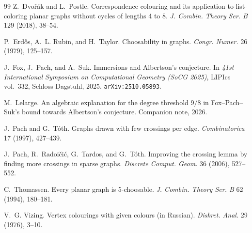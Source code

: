 \documentclass[11pt,a4paper]{article}
\theoremstyle{definition}
\begin{document}
\begin{thebibliography}{99}
Z.~Dvo\v{r}\'ak and L.~Postle.
\newblock Correspondence colouring and its application to list-coloring
planar graphs without cycles of lengths 4 to 8.
\newblock \emph{J. Combin. Theory Ser. B} 129 (2018), 38--54.

P.~Erd\H{o}s, A.~L. Rubin, and H.~Taylor.
\newblock Choosability in graphs.
\newblock \emph{Congr. Numer.} 26 (1979), 125--157.

J.~Fox, J.~Pach, and A.~Suk.
\newblock Immersions and Albertson's conjecture.
\newblock In \emph{41st International Symposium on Computational
Geometry (SoCG 2025)}, LIPIcs vol.~332, Schloss Dagstuhl, 2025.
\newblock \texttt{arXiv:2510.05893}.

M.~Lelarge.
\newblock An algebraic explanation for the degree threshold $9/8$
in Fox--Pach--Suk's bound towards Albertson's conjecture.
\newblock Companion note, 2026.

J.~Pach and G.~T\'oth.
\newblock Graphs drawn with few crossings per edge.
\newblock \emph{Combinatorica} 17 (1997), 427--439.

J.~Pach, R.~Radoi\v{c}i\'c, G.~Tardos, and G.~T\'oth.
\newblock Improving the crossing lemma by finding more crossings in
sparse graphs.
\newblock \emph{Discrete Comput. Geom.} 36 (2006), 527--552.

C.~Thomassen.
\newblock Every planar graph is 5-choosable.
\newblock \emph{J. Combin. Theory Ser. B} 62 (1994), 180--181.

V.~G. Vizing.
\newblock Vertex colourings with given colours (in Russian).
\newblock \emph{Diskret. Anal.} 29 (1976), 3--10.

\end{thebibliography}
\end{document}
